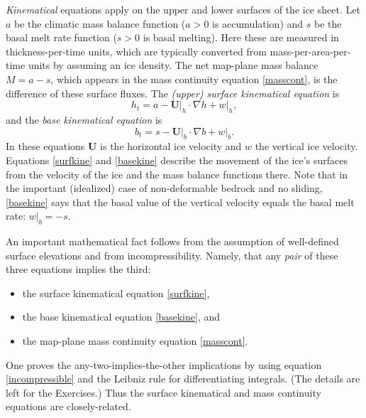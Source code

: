 \documentclass[letterpaper,final,12pt,reqno]{amsart}
\newcommand{\grad}{\nabla}
\begin{document}
\emph{Kinematical} equations apply on the upper and lower surfaces of the ice sheet.  Let $a$ be the climatic mass balance function ($a>0$ is accumulation) and $s$ be the basal melt rate function ($s>0$ is basal melting).  Here these are measured in thickness-per-time units, which are typically converted from mass-per-area-per-time units by assuming an ice density.  The net map-plane mass balance $M=a-s$, which appears in the mass continuity equation \eqref{masscont}, is the difference of these surface fluxes.  The \emph{(upper) surface kinematical equation} is
\begin{equation}
h_t = a - \mathbf{U}\big|_h \cdot \grad h + w\big|_h,  \label{surfkine}
\end{equation}
and the \emph{base kinematical equation} is
\begin{equation}
b_t = s - \mathbf{U}\big|_b \cdot \grad b + w\big|_b.  \label{basekine}
\end{equation}
In these equations $\mathbf{U}$ is the horizontal ice velocity and $w$ the vertical ice velocity.  Equations \eqref{surfkine} and \eqref{basekine} describe the movement of the ice's surfaces from the velocity of the ice and the mass balance functions there.  Note that in the important (idealized) case of non-deformable bedrock and no sliding, \eqref{basekine} says that the basal value of the vertical velocity equals the basal melt rate: $w\big|_b=-s$.

An important mathematical fact follows from the assumption of well-defined surface elevations and from incompressibility.  Namely, that any \emph{pair} of these three equations implies the third:
  \begin{itemize}
  \item the surface kinematical equation \eqref{surfkine},
  \item the base kinematical equation \eqref{basekine}, and
  \item the map-plane mass continuity equation \eqref{masscont}.
  \end{itemize}
One proves the any-two-implies-the-other implications by using equation \eqref{incompressible} and the Leibniz rule for differentiating integrals.  (The details are left for the Exercises.)  Thus the surface kinematical and mass continuity equations are closely-related.
\end{document}
